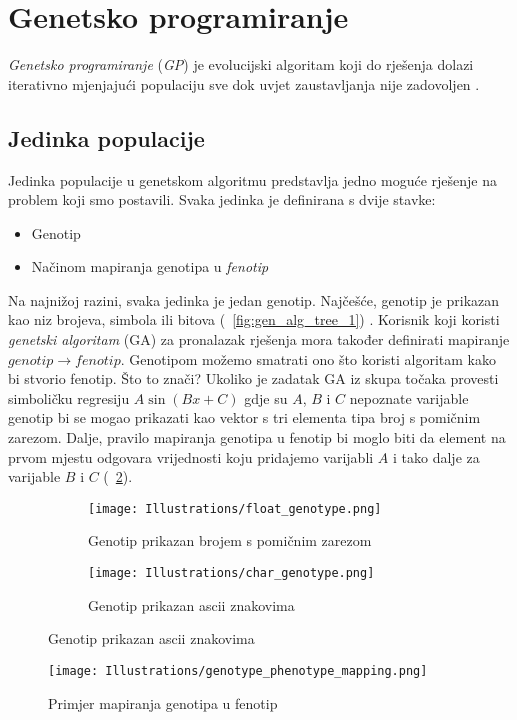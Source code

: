 \section{Genetsko programiranje}
\emph{Genetsko programiranje} (\emph{GP}) je evolucijski algoritam koji do rješenja dolazi iterativno mjenjajući populaciju sve dok uvjet zaustavljanja nije zadovoljen \cite{conv_gen_programming}.

\subsection{Jedinka populacije}
Jedinka populacije u genetskom algoritmu predstavlja jedno moguće rješenje na problem koji smo postavili.
Svaka jedinka je definirana s dvije stavke:
\begin{itemize}
	\item{Genotip}
	\item{Načinom mapiranja genotipa u \emph{fenotip}}
\end{itemize}
Na najnižoj razini, svaka jedinka je jedan genotip. 
Najčešće, genotip je prikazan kao niz brojeva, simbola ili bitova (~\ref{fig:gen_alg_tree_1}) \cite{naturally_selecting_algorithms}.
Korisnik koji koristi \emph{genetski algoritam} (GA) za pronalazak rješenja mora također definirati mapiranje $genotip \rightarrow fenotip$.
Genotipom možemo smatrati ono što koristi algoritam kako bi stvorio fenotip.
Što to znači?
Ukoliko je zadatak GA iz skupa točaka provesti simboličku regresiju $A\sin(Bx + C)$ gdje su $A$, $B$ i $C$ nepoznate varijable genotip bi se mogao prikazati kao vektor s tri elementa tipa broj s pomičnim zarezom.
Dalje, pravilo mapiranja genotipa u fenotip bi moglo biti da element na prvom mjestu odgovara vrijednosti koju pridajemo varijabli $A$ i tako dalje za varijable $B$ i $C$ (~\ref{fig:genotype_phenotype_map}).

\begin{figure}
	\caption{Mogućnosti spremanja i korištenja genotipa tijekom izvođenja genetskog algoritma}
	\begin{subfigure}[t]{0.45\textwidth}
		\texttt{[image: Illustrations/float\_genotype.png]}
		\caption{Genotip prikazan brojem s pomičnim zarezom}
	\end{subfigure}
	\hspace{\fill}
	\begin{subfigure}[t]{0.45\textwidth}
		\texttt{[image: Illustrations/char\_genotype.png]}
		\caption{Genotip prikazan ascii znakovima}
	\end{subfigure}
	\label{fig:genotype_types}
\end{figure}

\begin{figure}
	\texttt{[image: Illustrations/genotype\_phenotype\_mapping.png]}
	\caption{Primjer mapiranja genotipa u fenotip}
	\label{fig:genotype_phenotype_map}
\end{figure}
